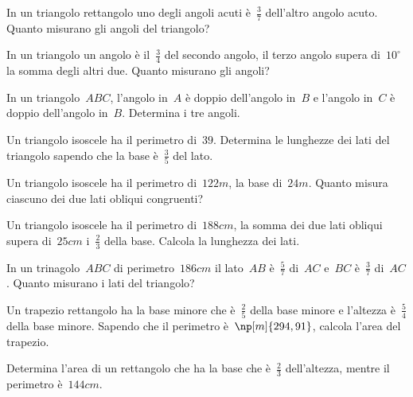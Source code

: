 \begin{multicols}{2}
\begin{esercizio}[\Ast]
In un triangolo rettangolo uno degli angoli acuti è~$\frac{3}{7}$ dell'altro angolo acuto. Quanto misurano gli angoli del triangolo?
\end{esercizio}

\begin{esercizio}[\Ast]
In un triangolo un angolo è il~$\frac{3}{4}$ del secondo angolo, il terzo angolo supera di~$10^{\circ}$ la somma degli altri due. Quanto misurano gli angoli?
\end{esercizio}

\begin{esercizio}
In un triangolo~$ABC$, l'angolo in~$A$ è doppio dell'angolo in~$B$ e l'angolo in~$C$ è doppio dell'angolo in~$B$. Determina i tre angoli.
\end{esercizio}

\begin{esercizio}
Un triangolo isoscele ha il perimetro di~$39$. Determina le lunghezze dei lati del triangolo sapendo che la base è~$\frac{3}{5}$ del lato.
\end{esercizio}

\begin{esercizio}[\Ast]
Un triangolo isoscele ha il perimetro di~$122\unit{m}$, la base di~$24\unit{m}$. Quanto misura ciascuno dei due lati obliqui congruenti?
\end{esercizio}

\begin{esercizio}[\Ast]
Un triangolo isoscele ha il perimetro di~$188\unit{cm}$, la somma dei due lati obliqui supera di~$25\unit{cm}$ i~$\frac{2}{3}$ della base. Calcola la lunghezza dei lati.
\end{esercizio}

\begin{esercizio}[\Ast]
In un trinagolo~$ABC$ di perimetro~$186\unit{cm}$ il lato~$AB$ è~$\frac{5}{7}$ di~$AC$ e~$BC$ è~$\frac{3}{7}$ di~$AC$. Quanto misurano i lati del triangolo?
\end{esercizio}

\begin{esercizio}[\Ast]
Un trapezio rettangolo ha la base minore che è~$\frac{2}{5}$ della base minore e l'altezza è~$\frac{5}{4}$ della base minore. Sapendo che il perimetro è~$\np[m]{294,91}$, calcola l'area del trapezio.
\end{esercizio}

\begin{esercizio}[\Ast]
Determina l'area di un rettangolo che ha la base che è~$\frac{2}{3}$ dell'altezza, mentre il perimetro è~$144\unit{cm}$.
\end{esercizio}


\end{multicols}
